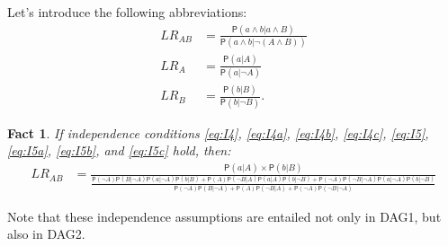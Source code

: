 \documentclass[
  10pt,
  dvipsnames,enabledeprecatedfontcommands]{scrartcl}
\newtheorem{fact}{Fact}
\newcommand{\n}{\neg}
\newcommand{\pr}[1]{\ensuremath{\mathsf{P}(#1)}}
\begin{document}
\noindent Let's introduce the following abbreviations: \begin{align*}
LR_{AB} &= \frac{\pr{a\wedge b \vert a\wedge B}}{\pr{a \wedge b \vert \neg (A\wedge B)}}\\
LR_A & = \frac{\pr{a \vert A}}{\pr{a \vert \n A}} \\
LR_B & = \frac{\pr{b \vert B}}{\pr{b \vert \n B}}.
\end{align*}

\begin{fact} If independence conditions  \eqref{eq:I4}, \eqref{eq:I4a}, \eqref{eq:I4b},   \eqref{eq:I4c},  \eqref{eq:I5},   \eqref{eq:I5a},    \eqref{eq:I5b}, and   \eqref{eq:I5c}    hold, then:
\begin{align*}
LR_{AB} & =  \frac{\pr{a \vert A} \times \pr{b \vert B}}
 {\frac{\pr{\neg A}\pr{B \vert \neg A} \pr{a \vert \neg A}\pr{b \vert B} + \pr{A}\pr{\neg B \vert A} \pr{a \vert A }\pr{b \vert \neg B} + \pr{\neg A}\pr{\neg B \vert \neg A } \pr{a \vert \neg A}\pr{b \vert \neg B}}{\pr{\neg A}\pr{B \vert \neg A} + \pr{A}\pr{\neg B \vert A } + \pr{\neg A}\pr{\neg B \vert \neg A} }}
\end{align*}
\end{fact}

\noindent Note that these independence assumptions are entailed not only
in \textsf{DAG1}, but also in \textsf{DAG2}.
\end{document}
